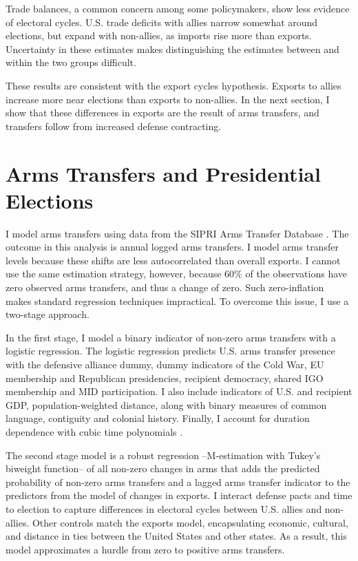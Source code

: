 \documentclass[12pt]{article}
\begin{document}
Trade balances, a common concern among some policymakers, show less evidence of electoral cycles. 
U.S. trade deficits with allies narrow somewhat around elections, but expand with non-allies, as imports rise more than exports. 
Uncertainty in these estimates makes distinguishing the estimates between and within the two groups difficult.


These results are consistent with the export cycles hypothesis. 
Exports to allies increase more near elections than exports to non-allies.
In the next section, I show that these differences in exports are the result of arms transfers, and transfers follow from increased defense contracting.



\section{Arms Transfers and Presidential Elections}


I model arms transfers using data from the SIPRI Arms Transfer Database \citep{SIPRI2021}.
The outcome in this analysis is annual logged arms transfers.
I model arms transfer levels because these shifts are less autocorrelated than overall exports.
I cannot use the same estimation strategy, however, because 60\% of the observations have zero observed arms transfers, and thus a change of zero.
Such zero-inflation makes standard regression techniques impractical.
To overcome this issue, I use a two-stage approach. 


In the first stage, I model a binary indicator of non-zero arms transfers with a logistic regression. 
The logistic regression predicts U.S. arms transfer presence with the defensive alliance dummy, dummy indicators of the Cold War, EU membership and Republican presidencies, recipient democracy, shared IGO membership and MID participation. 
I also include indicators of U.S. and recipient GDP, population-weighted distance, along with binary measures of common language, contiguity and colonial history. 
Finally, I account for duration dependence with cubic time polynomials \citep{CarterSignorino2010}.


The second stage model is a robust regression --M-estimation with Tukey's biweight function-- of all non-zero changes in arms that adds the predicted probability of non-zero arms transfers and a lagged arms transfer indicator to the predictors from the model of changes in exports.
I interact defense pacts and time to election to capture differences in electoral cycles between U.S. allies and non-allies. 
Other controls match the exports model, encapsulating economic, cultural, and distance in ties between the United States and other states. 
As a result, this model approximates a hurdle from zero to positive arms transfers.
\end{document}
